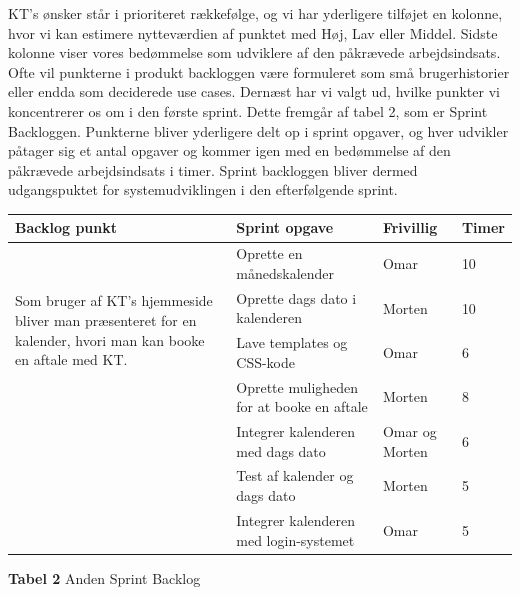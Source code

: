 \documentclass[12pt]{article}   %
\begin{document}
KT's ønsker står i prioriteret rækkefølge, og vi har yderligere tilføjet en
kolonne, hvor vi kan estimere nytteværdien af punktet med Høj, Lav eller
Middel. Sidste kolonne viser vores bedømmelse som udviklere af den påkrævede
arbejdsindsats. Ofte vil punkterne i produkt backloggen være formuleret som
små brugerhistorier eller endda som deciderede use cases. Dernæst har vi
valgt ud, hvilke punkter vi koncentrerer os om i den første sprint. Dette
fremgår af tabel 2, som er Sprint Backloggen. Punkterne bliver yderligere
delt op i sprint opgaver, og hver udvikler påtager sig et antal opgaver og
kommer igen med en bedømmelse af den påkrævede arbejdsindsats i timer. Sprint
backloggen bliver dermed udgangspuktet for systemudviklingen i den
efterfølgende sprint. 


\begin{center}
	\begin{tabular}{|l|p{4cm}|l|l|}
		\hline
		Backlog punkt & Sprint opgave & Frivillig & Timer\\ \hline
		\multirow{4}{4cm}{Som bruger af KT's hjemmeside bliver man præsenteret for en kalender, hvori man
		kan booke en aftale med KT.} & Oprette en månedskalender & Omar  & 10 \\
		& Oprette dags dato i kalenderen & Morten & 10 \\
		& Lave templates og CSS-kode & Omar & 6 \\
		& Oprette muligheden for at booke en aftale & Morten
		& 8 \\ 
		& Integrer kalenderen med dags dato & Omar og Morten & 6 \\
		& Test af kalender og dags dato & Morten & 5
		\\ & Integrer kalenderen med login-systemet & Omar & 5 \\
		\hline

	\end{tabular}
\end{center}

\begin{center}
\textbf{Tabel 2} Anden Sprint Backlog
\end{center}

\vspace{0.5cm}
\end{document}
